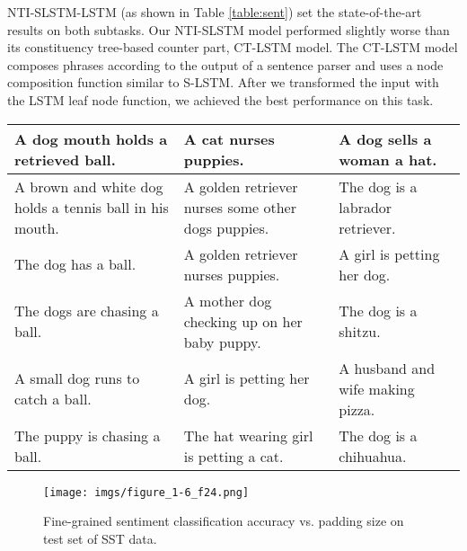 \documentclass[11pt]{article}
\begin{document}
NTI-SLSTM-LSTM (as shown in Table \ref{table:sent}) set the state-of-the-art results on both subtasks.
Our NTI-SLSTM model performed slightly worse than its constituency tree-based counter part, CT-LSTM model. The CT-LSTM model composes phrases according to the output of a sentence parser and uses a node composition function similar to S-LSTM. After we transformed the input with the LSTM leaf node function, we achieved the best performance on this task. 

\begin{table*}[t]
\begin{center}
\small
\begin{tabular}{l|l|l}
\hline 
\bf A dog mouth holds a retrieved ball. & \bf A cat nurses puppies. & \bf \bf A dog sells a woman a hat. \\
\hline
\multicolumn{1}{p{5cm}|}{A brown and white dog holds  a tennis ball in his mouth.} & \multicolumn{1}{|p{5cm}|}{A golden retriever nurses some other dogs puppies.} & \multicolumn{1}{|l}{The dog is a labrador retriever.} 
\\
\multicolumn{1}{l|}{The dog has a ball.} & \multicolumn{1}{|l|}{A golden retriever nurses puppies.} & \multicolumn{1}{|l}{A girl is petting her dog.} 
\\
\multicolumn{1}{l|}{The dogs are chasing a ball.} & \multicolumn{1}{|p{5cm}|}{A mother dog checking up on her baby puppy.} & \multicolumn{1}{|l}{The dog is a shitzu.} 
\\
\multicolumn{1}{l|}{A small dog runs to catch a ball.} & \multicolumn{1}{|l|}{A girl is petting her dog.} & \multicolumn{1}{|l}{A husband and wife making pizza.} 
\\
\multicolumn{1}{l|}{The puppy is chasing a ball.} & \multicolumn{1}{|l|}{The hat wearing girl is petting a cat.} & \multicolumn{1}{|l}{The dog is a chihuahua.} \\
\hline
\end{tabular}
\end{center}
\caption{\label{table:sent}Nearest-neighbor sentences based on cosine similarity between learned representations.}
\end{table*}

\begin{figure}[b]
\vspace*{-0.7cm}
\hspace*{-1.2cm}
    \centering
        \texttt{[image: imgs/figure\_1-6\_f24.png]}
        \caption{Fine-grained sentiment classification accuracy vs. padding size on test set of SST data.}
        \label{figure:pad}
\end{figure}
\end{document}
